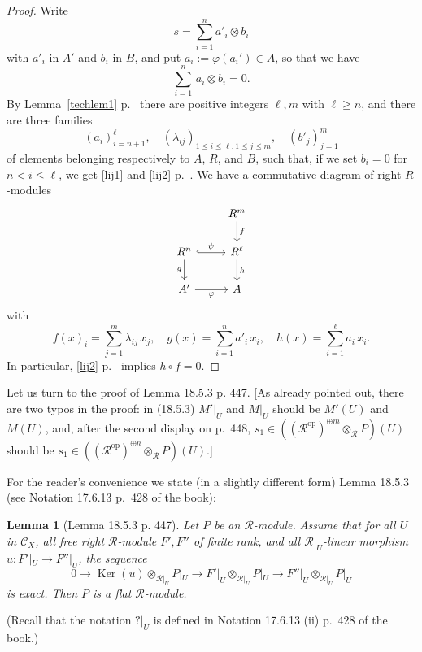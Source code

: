 \documentclass[12pt]{article}
\newtheorem{lem}[thm]{Lemma}
\theoremstyle{remark}
\theoremstyle{definition}
\newcommand{\cc}{\mathcal}
\newcommand{\C}{\mathcal C}
\newcommand{\pp}{\varphi}
\DeclareMathOperator{\Ker}{Ker}
\DeclareMathOperator{\op}{op}
\begin{document}
\begin{proof} 
Write 
$$
s=\sum_{i=1}^na'_i\otimes b_i
$$ 
with $a'_i$ in $A'$ and $b_i$ in $B$, and put $a_i:=\pp(a_i')\in A$, so that we have 
$$
\sum_{i=1}^n\,a_i\otimes b_i=0.
$$ 
By Lemma~\ref{techlem1} p.~\pageref{techlem1} there are positive integers $\ell,m$ with $\ell\ge n$, and there are three families 
$$
(a_i)_{i=n+1}^\ell,\quad(\lambda_{ij})_{1\le i\le\ell,1\le j\le m},\quad(b'_j)_{j=1}^m
$$ 
of elements belonging respectively to $A$, $R$, and $B$, such that, if we set $b_i=0$ for $n<i\le\ell$, we get \eqref{lij1} and \eqref{lij2} p.~\pageref{lij1}. We have a commutative diagram of right $R$-modules 
%
\begin{equation}\label{d447}
\begin{tikzcd}
{}&R^m\ar{d}{f}\\ 
R^n\ar[hook]{r}{\psi}\ar{d}[swap]{g}&R^\ell\ar{d}{h}\\ 
A'\ar{r}[swap]{\pp}&A
\end{tikzcd}
\end{equation}
%
with 
$$
f(x)_i=\sum_{j=1}^m\lambda_{ij}\,x_j,\quad g(x)=\sum_{i=1}^na'_i\,x_i,\quad h(x)=\sum_{i=1}^\ell a_i\,x_i.
$$ 
In particular, \eqref{lij2} p.~\pageref{lij2} implies $h\circ f=0$. 
\end{proof} 

Let us turn to the proof of Lemma 18.5.3 p. 447. [As already pointed out, there are two typos in the proof: in (18.5.3) $M'|_U$ and $M|_U$ should be $M'(U)$ and $M(U)$, and, after the second display on p.~448, $s_1\in((\cc R^{\op})^{\oplus m}\otimes_{\cc R}P)(U)$ should be $s_1\in((\cc R^{\op})^{\oplus n}\otimes_{\cc R}P)(U)$.] 

For the reader's convenience we state (in a slightly different form) Lemma 18.5.3 (see Notation 17.6.13 p.~428 of the book): 

\begin{lem}[Lemma 18.5.3 p. 447]\label{l1853}
Let $P$ be an $\cc R$-module. Assume that for all $U$ in $\C_X$, all free right $\cc R$-module $F',F''$ of finite rank, and all $\cc R|_U$-linear morphism $u:F'|_U\to F''|_U$, the sequence 
$$
0\to\Ker(u)\otimes_{\cc R|_U}P|_U\to F'|_U\otimes_{\cc R|_U}P|_U\to F''|_U\otimes_{\cc R|_U}P|_U
$$ 
is exact. Then $P$ is a flat $\cc R$-module.
\end{lem} 

(Recall that the notation $?|_U$ is defined in Notation 17.6.13 (ii) p.~428 of the book.)
\end{document}
